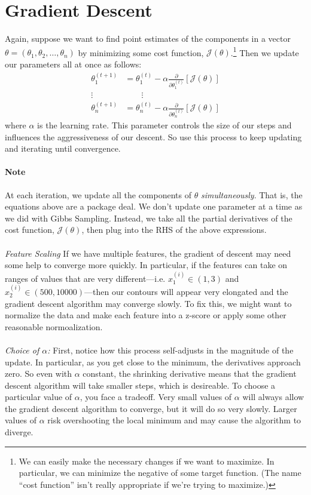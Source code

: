 \documentclass[12pt]{article}
\begin{document}
\section{Gradient Descent}

Again, suppose we want to find point estimates of the components in
a vector $\theta = (\theta_1, \theta_2, \ldots, \theta_n)$ by
minimizing some cost function, $\mathcal{J}(\theta)$.\footnote{We
can easily make the necessary changes if we want to maximize. In
particular, we can minimize the negative of some target function. (The
name ``cost function'' isn't really appropriate if we're trying to
maximize.)} Then we update our parameters all at once as follows:
\begin{align*}
   \theta_1^{(t+1)} &= \theta_1^{(t)} - \alpha \frac{\partial}{
      \partial \theta_1^{(t)}}\left[ \mathcal{J}(\theta)\right]\\
   \vdots \qquad & \qquad \vdots \\
   \theta_n^{(t+1)} &= \theta_n^{(t)} - \alpha \frac{\partial}{
      \partial \theta_n^{(t)}}\left[ \mathcal{J}(\theta)\right]
\end{align*}
where $\alpha$ is the learning rate. This parameter controls the
size of our steps and influences the aggressiveness of our
descent. So use this process to keep updating and iterating
until convergence.

\paragraph{Note} At each iteration, we update all the components of
$\theta$ \emph{simultaneously}. That is, the equations above are a
package deal. We don't update one parameter at a time as we did
with Gibbs Sampling. Instead, we take all the partial derivatives
of the cost function, $\mathcal{J}(\theta)$, then plug into the RHS
of the above expressions.
\\
\\
{\sl Feature Scaling} If we have multiple features, the gradient
of descent may need some help to converge more quickly.  In particular,
if the features can take on ranges of values that are very
different---i.e. $x_1^{(i)} \in (1,3)$ and $x_2^{(i)}
\in (500,10000)$---then our contours will appear very elongated and the
gradient descent algorithm may converge slowly.  To fix this, we might
want to normalize the data and make each feature into a z-score or
apply some other reasonable normoalization.
\\
\\
{\sl Choice of $\alpha$:} First, notice how this process
self-adjusts in the
magnitude of the update.  In particular, as you get close to
the minimum, the derivatives approach zero.  So even with
$\alpha$ constant, the shrinking derivative means that the gradient
descent algorithm will take smaller steps, which is desireable.
To choose a particular value of $\alpha$, you face a tradeoff. Very
small values of $\alpha$ will always allow the gradient descent
algorithm to converge, but it will do so very slowly.  Larger values
of $\alpha$ risk overshooting the local minimum and may cause the
algorithm to diverge.
\end{document}
